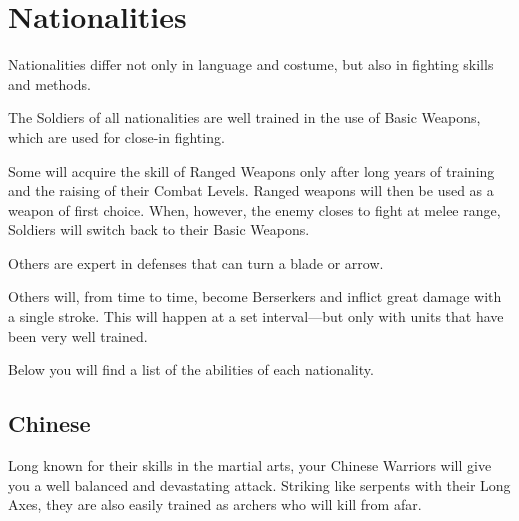 

\chapter{Nationalities}

Nationalities differ not only in language and costume, but also in fighting skills and methods.

The Soldiers of all nationalities are well trained in the use of Basic Weapons, which are used for close-in fighting.

Some will acquire the skill of Ranged Weapons only after long years of training and the raising of their Combat Levels. Ranged weapons will then be used as a weapon of first choice. When, however, the enemy closes to fight at melee range, Soldiers will switch back to their Basic Weapons.

Others are expert in defenses that can turn a blade or arrow.

Others will, from time to time, become Berserkers and inflict great damage with a single stroke. This will happen at a set interval---but only with units that have been very well trained.

Below you will find a list of the abilities of each nationality.

\clearpage

\section{Chinese}

Long known for their skills in the martial arts, your Chinese Warriors will give you a well balanced and devastating attack. Striking like serpents with their Long Axes, they are also easily trained as archers who will kill from afar.

